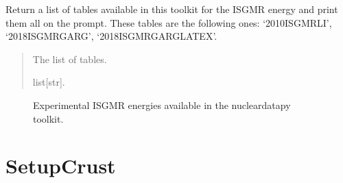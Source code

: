 \documentclass[letterpaper,10pt,english]{sphinxmanual}
\begin{document}
\begin{fulllineitems}
\label{\detokenize{source/api/setup_nuc_isgmr_exp:nucleardatapy.setup_nuc_isgmr_exp.nuc_isgmr_exp_tables}}
\pysigstartsignatures
\pysiglinewithargsret
{}
{}
{}
\pysigstopsignatures
\sphinxAtStartPar
Return a list of tables available in this toolkit for the ISGMR energy and
print them all on the prompt. These tables are the following
ones: ‘2010\sphinxhyphen{}ISGMR\sphinxhyphen{}LI’, ‘2018\sphinxhyphen{}ISGMR\sphinxhyphen{}GARG’, ‘2018\sphinxhyphen{}ISGMR\sphinxhyphen{}GARG\sphinxhyphen{}LATEX’.
\begin{quote}\begin{description}
\sphinxAtStartPar
The list of tables.

\sphinxAtStartPar
list{[}str{]}.

\end{description}\end{quote}

\end{fulllineitems}


\begin{figure}[htbp]
\centering
\capstart

\noindent{}
\caption{Experimental ISGMR energies available in the nucleardatapy toolkit.}\label{\detokenize{source/api/setup_nuc_isgmr_exp:id1}}\end{figure}

\sphinxstepscope


\section{SetupCrust}
\label{\detokenize{source/api/setup_crust:setupcrust}}\label{\detokenize{source/api/setup_crust::doc}}\label{\detokenize{source/api/setup_crust:module-nucleardatapy.setup_crust}}
\end{document}
